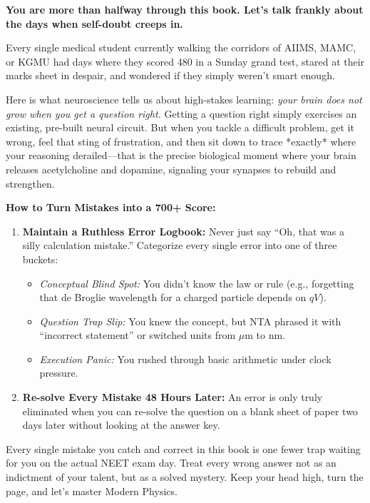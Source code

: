 \documentclass[10pt,twoside,openright]{book}
\begin{document}
\begin{mentorbox}
\textbf{You are more than halfway through this book. Let's talk frankly about the days when self-doubt creeps in.}

Every single medical student currently walking the corridors of AIIMS, MAMC, or KGMU had days where they scored 480 in a Sunday grand test, stared at their marks sheet in despair, and wondered if they simply weren't smart enough.

Here is what neuroscience tells us about high-stakes learning: \textit{your brain does not grow when you get a question right.} Getting a question right simply exercises an existing, pre-built neural circuit. But when you tackle a difficult problem, get it wrong, feel that sting of frustration, and then sit down to trace *exactly* where your reasoning derailed---that is the precise biological moment where your brain releases acetylcholine and dopamine, signaling your synapses to rebuild and strengthen.

\textbf{How to Turn Mistakes into a 700+ Score:}
\begin{enumerate}[leftmargin=*]
  \item \textbf{Maintain a Ruthless Error Logbook:} Never just say ``Oh, that was a silly calculation mistake.'' Categorize every single error into one of three buckets:
  \begin{itemize}
    \item \textit{Conceptual Blind Spot:} You didn't know the law or rule (e.g., forgetting that de Broglie wavelength for a charged particle depends on $qV$).
    \item \textit{Question Trap Slip:} You knew the concept, but NTA phrased it with ``incorrect statement'' or switched units from $\mu\text{m}$ to $\text{nm}$.
    \item \textit{Execution Panic:} You rushed through basic arithmetic under clock pressure.
  \end{itemize}
  \item \textbf{Re-solve Every Mistake 48 Hours Later:} An error is only truly eliminated when you can re-solve the question on a blank sheet of paper two days later without looking at the answer key.
\end{enumerate}

Every single mistake you catch and correct in this book is one fewer trap waiting for you on the actual NEET exam day. Treat every wrong answer not as an indictment of your talent, but as a solved mystery. Keep your head high, turn the page, and let's master Modern Physics.
\end{mentorbox}
\end{document}
